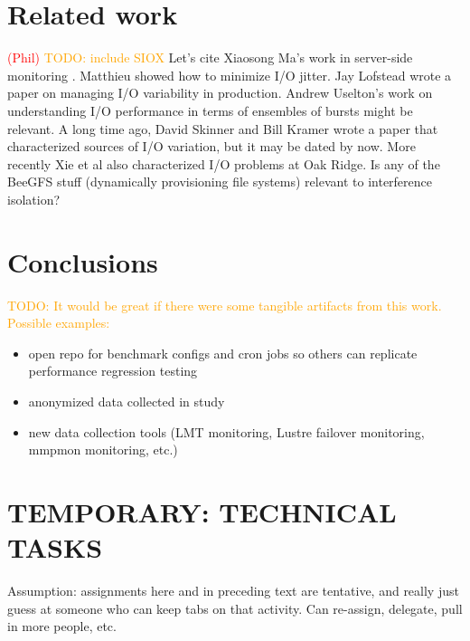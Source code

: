 \documentclass[conference,10pt,compsocconf]{IEEEtran}
\newcommand{\assign}[1]{\textcolor{red}{(#1)}}
\newcommand{\todo}[1]{\textcolor{Orange}{TODO: #1}}
\begin{document}
\section{Related work} \label{related}

\assign{Phil} \todo{include SIOX} Let's cite Xiaosong Ma's work in server-side
monitoring \cite{Liu2016}.  Matthieu showed how to
minimize I/O jitter\cite{Dorier2012}.  Jay Lofstead wrote a paper on managing
I/O variability in production\cite{Lofstead2010}.  Andrew Uselton's work on
understanding I/O performance in terms of ensembles of bursts might be
relevant\cite{Uselton2010}.  A long time ago, David Skinner and Bill Kramer
wrote a paper that characterized sources of I/O variation, but it may be dated
by now\cite{Skinner2005}.  More recently Xie et al also characterized I/O
problems at Oak Ridge\cite{Xie2012}.  Is any of the BeeGFS stuff (dynamically
provisioning file systems) relevant to interference isolation?

\section{Conclusions}

\todo{It would be great if there were some tangible artifacts from this work.
Possible examples:}
\begin{itemize}
\item open repo for benchmark configs and cron jobs so others can replicate
performance regression testing
\item anonymized data collected in study
\item new data collection tools (LMT monitoring, Lustre failover monitoring,
mmpmon monitoring, etc.)
\end{itemize}

\section{TEMPORARY: TECHNICAL TASKS}

Assumption: assignments here and in preceding text are tentative, and really
just guess at someone who can keep tabs on that activity.  Can re-assign,
delegate, pull in more people, etc.
\end{document}
